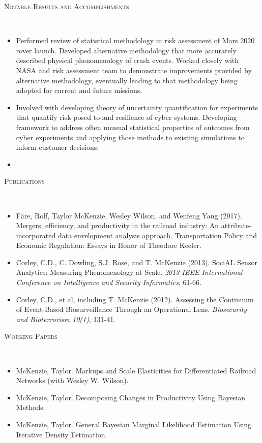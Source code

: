\documentclass[11pt]{article}
\newenvironment{changemargin}[2]{%
  \begin{list}{}{%
    \setlength{\topsep}{0pt}%
    \setlength{\leftmargin}{#1}%
    \setlength{\rightmargin}{#2}%
    \setlength{\listparindent}{\parindent}%
    \setlength{\itemindent}{\parindent}%
    \setlength{\parsep}{\parskip}%
  }%
  \item[]}{\end{list}
}
\newcommand{\lineover}{
	\begin{changemargin}{-0.05in}{-0.05in}
		\vspace*{-8pt}
		\hrulefill \\
		\vspace*{-2pt}
	\end{changemargin}
}
\newcommand{\header}[1]{
	\begin{changemargin}{-0.5in}{-0.5in}
		\scshape{#1}\\
  	\lineover
	\end{changemargin}
}
\newenvironment{body} {
	\vspace*{-16pt}
	\begin{changemargin}{-0.25in}{-0.5in}
  }	
	{\end{changemargin}
}
\begin{document}
\smallskip
\header{Notable Results and Accomplishments}
\begin{body}
	\vspace{14pt}
	\begin{itemize}
		\item Performed review of statistical methodology in risk assessment of Mars 2020 rover launch. Developed alternative methodology that more accurately described physical phenomenology of crash events. Worked closely with NASA and risk assessment team to demonstrate improvements provided by alternative methodology, eventually leading to that methodology being adopted for current and future missions.
		\item Involved with developing theory of uncertainty quantification for experiments that quantify risk posed to and resilience of cyber systems. Developing framework to address often unusual statistical properties of outcomes from cyber experiments and applying those methods to existing simulations to inform customer decisions.
		\item 
	\end{itemize}
\end{body}

\smallskip
\header{Publications}

\begin{body}
\vspace{14pt}
\begin{itemize}
	\item F\"{a}re, Rolf, Taylor McKenzie, Wesley Wilson, and Wenfeng Yang (2017). Mergers, efficiency, and productivity in the railroad industry: An attribute-incorporated data envelopment analysis approach. Transportation Policy and Economic Regulation: Essays in Honor of Theodore Keeler.
	\item Corley, C.D., C. Dowling, S.J. Rose, and T. McKenzie (2013). SociAL Sensor Analytics: Measuring Phenomenology at Scale. \textit{2013 IEEE International Conference on Intelligence and Security Informatics}, 61-66.
	\item Corley, C.D., et al, including T. McKenzie (2012). Assessing the Continuum of Event-Based Biosurveillance Through an Operational Lens. \textit{Biosecurity and Bioterrorism 10(1)}, 131-41.
\end{itemize}
\end{body}

\smallskip
\header{Working Papers}

\begin{body}
\vspace{14pt}
\begin{itemize}
	\item McKenzie, Taylor. Markups and Scale Elasticities for Differentiated Railroad Networks (with Wesley W. Wilson).
	\item McKenzie, Taylor. Decomposing Changes in Productivity Using Bayesian Methods.
	\item McKenzie, Taylor. General Bayesian Marginal Likelihood Estimation Using Iterative Density Estimation.
\end{itemize}
\end{body}
\end{document}
